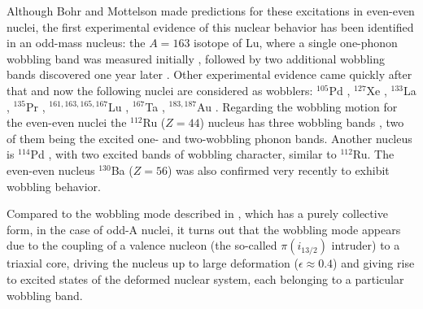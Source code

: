 \documentclass[myclassdoc,debug]{rjparticle}
\begin{document}
Although Bohr and Mottelson made predictions for these excitations in even-even nuclei, the first experimental evidence of this nuclear behavior has been identified in an odd-mass nucleus: the $A=163$ isotope of Lu, where a single one-phonon wobbling band was measured initially \cite{odegaard2001evidence}, followed by two additional wobbling bands discovered one year later \cite{jensen2002evidence,jensen2002wobbling}. Other experimental evidence came quickly after that and now the following nuclei are considered as wobblers: $^{105}$Pd \cite{timar2019experimental}, $^{127}$Xe \cite{chakraborty2020multiphonon}, $^{133}$La \cite{biswas2019longitudinal}, $^{135}$Pr \cite{matta2017transverse,sensharma2019two}, $^{161,163,165,167}$Lu \cite{bringel2005evidence,jensen2002evidence,jensen2002wobbling,schonwasser2003one,amro2003wobbling}, $^{167}$Ta \cite{hartley2009wobbling}, $^{183,187}$Au \cite{nandi2020first,sensharma2020longitudinal}. Regarding the wobbling motion for the even-even nuclei the $^{112}$Ru ($Z=44$) nucleus has three wobbling bands \cite{hamilton2010super}, two of them being the excited one- and two-wobbling phonon bands. Another nucleus is $^{114}$Pd \cite{luo2013triaxial}, with two excited bands of wobbling character, similar to $^{112}$Ru. The even-even nucleus $^{130}$Ba ($Z=56$) \cite{petrache2019diversity,wang2020two,chen2019transverse} was also confirmed very recently to exhibit wobbling behavior.

Compared to the wobbling mode described in \cite{bohr1998nuclear}, which has a purely collective form, in the case of odd-A nuclei, it turns out that the wobbling mode appears due to the coupling of a valence nucleon (the so-called $\pi(i_{13/2})$ intruder) to a triaxial core, driving the nucleus up to large deformation ($\epsilon\approx0.4$) \cite{schnack1995superdeformed} and giving rise to excited states of the deformed nuclear system, each belonging to a particular wobbling band.
\end{document}

